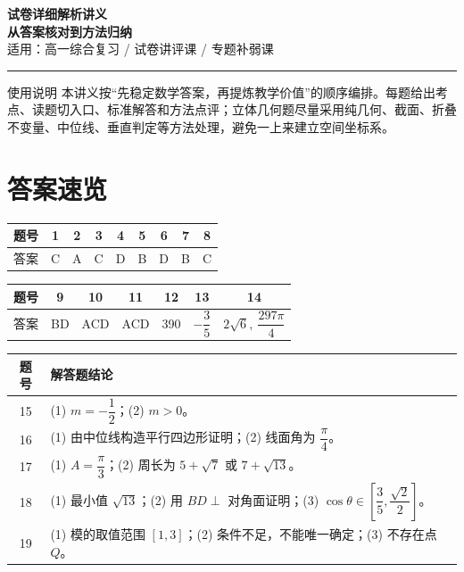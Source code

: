 \documentclass[11pt,a4paper]{ctexart}
\begin{document}
\begin{center}
  {\bfseries 试卷详细解析讲义}\\[2mm]
  {\Large \bfseries 从答案核对到方法归纳}\\[2mm]
  {\large 适用：高一综合复习 / 试卷讲评课 / 专题补弱课}\\[2mm]
  \rule{0.86\linewidth}{0.5pt}
\end{center}

\begin{teachbox}{使用说明}
本讲义按“先稳定数学答案，再提炼教学价值”的顺序编排。每题给出考点、读题切入口、标准解答和方法点评；立体几何题尽量采用纯几何、截面、折叠不变量、中位线、垂直判定等方法处理，避免一上来建立空间坐标系。
\end{teachbox}

\section{答案速览}

\begin{center}
\small
\begin{tabularx}{0.96\linewidth}{c c c c c c c c c}
\toprule
题号 & 1 & 2 & 3 & 4 & 5 & 6 & 7 & 8\\
\midrule
答案 & C & A & C & D & B & D & B & C\\
\bottomrule
\end{tabularx}
\end{center}

\begin{center}
\small
\begin{tabularx}{0.96\linewidth}{c c c c c c c}
\toprule
题号 & 9 & 10 & 11 & 12 & 13 & 14\\
\midrule
答案 & BD & ACD & ACD & 390 & \(-\dfrac35\) & \(2\sqrt6,\ \dfrac{297\pi}{4}\)\\
\bottomrule
\end{tabularx}
\end{center}

\begin{center}
\small
\begin{tabularx}{0.96\linewidth}{c X}
\toprule
题号 & 解答题结论\\
\midrule
15 & (1) \(m=-\dfrac12\)；(2) \(m>0\)。\\
16 & (1) 由中位线构造平行四边形证明；(2) 线面角为 \(\dfrac{\pi}{4}\)。\\
17 & (1) \(A=\dfrac{\pi}{3}\)；(2) 周长为 \(5+\sqrt7\) 或 \(7+\sqrt{13}\)。\\
18 & (1) 最小值 \(\sqrt{13}\)；(2) 用 \(BD\perp\) 对角面证明；(3) \(\cos\theta\in\left[\dfrac35,\dfrac{\sqrt2}{2}\right]\)。\\
19 & (1) 模的取值范围 \([1,3]\)；(2) 条件不足，不能唯一确定；(3) 不存在点 \(Q\)。\\
\bottomrule
\end{tabularx}
\end{center}
\end{document}
